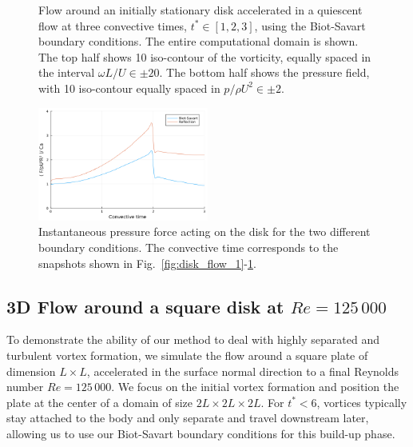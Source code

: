 \documentclass[preprint,12pt]{elsarticle}
\begin{document}
\begin{figure}
\begin{subfigure}{.33\textwidth}
    \end{subfigure}
    \caption{Flow around an initially stationary disk accelerated in a quiescent flow at three convective times, $t^*\in [1,2,3]$, using the Biot-Savart boundary conditions. The entire computational domain is shown. The top half shows 10 iso-contour of the vorticity, equally spaced in the interval $\omega L/U\in\pm20$. The bottom half shows the pressure field, with 10 iso-contour equally spaced in $p/\rho U^2\in\pm2$.}
    \label{fig:disk_flow_2}
\end{figure}


\begin{figure}
    \centering
    \includegraphics[width=0.5\textwidth]{tex//fig/Disk_256D_force.png}
    \caption{Instantaneous pressure force acting on the disk for the two different boundary conditions. The convective time corresponds to the snapshots shown in Fig.~\ref{fig:disk_flow_1}-\ref{fig:disk_flow_2}.}
    \label{fig:disk_forces}
\end{figure}


\subsection{3D Flow around a square disk at $Re=125\,000$}

To demonstrate the ability of our method to deal with highly separated and turbulent vortex formation, we simulate the flow around a square plate of dimension $L\times L$, accelerated in the surface normal direction to a final Reynolds number $Re=125\,000$. We focus on the initial vortex formation and position the plate at the center of a domain of size $2L\times2L\times2L$. For $t^*<6$, vortices typically stay attached to the body and only separate and travel downstream later, allowing us to use our Biot-Savart boundary conditions for this build-up phase. 
\end{document}
